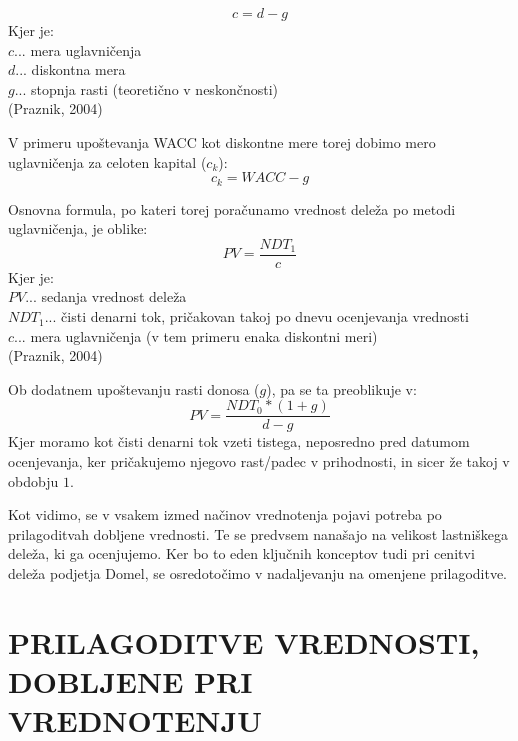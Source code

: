 \documentclass[12pt,a4paper]{amsart}
\theoremstyle{definition} %
\theoremstyle{plain} %
\begin{document}
\begin{equation}
c=d-g
\end{equation}
Kjer je:\\
$c$... mera uglavničenja\\
$d$... diskontna mera\\
$g$... stopnja rasti (teoretično v neskončnosti)\\
(Praznik, 2004)\par

V primeru upoštevanja WACC kot diskontne mere torej dobimo mero uglavničenja za celoten kapital ($c_k$):
\begin{equation}
c_k=WACC-g
\end{equation}

Osnovna formula, po kateri torej poračunamo vrednost deleža po metodi uglavničenja, je oblike:
\begin{equation}
PV=\frac{NDT_1}{c}
\end{equation}
Kjer je:\\
$PV$... sedanja vrednost deleža\\
$NDT_1$... čisti denarni tok, pričakovan takoj po dnevu ocenjevanja vrednosti\\
$c$... mera uglavničenja (v tem primeru enaka diskontni meri)\\
(Praznik, 2004)\par

Ob dodatnem upoštevanju rasti donosa ($g$), pa se ta preoblikuje v:
\begin{equation}
PV=\frac{NDT_0*(1+g)}{d-g}
\end{equation}
Kjer moramo kot čisti denarni tok vzeti tistega, neposredno pred datumom ocenjevanja, ker pričakujemo njegovo rast/padec v prihodnosti, in sicer že takoj v obdobju $1$.\par

Kot vidimo, se v vsakem izmed načinov vrednotenja pojavi potreba po prilagoditvah dobljene vrednosti. Te se predvsem nanašajo na velikost lastniškega deleža, ki ga ocenjujemo. Ker bo to eden ključnih konceptov tudi pri cenitvi deleža podjetja Domel, se osredotočimo v nadaljevanju na omenjene prilagoditve.




\section{\textbf{PRILAGODITVE VREDNOSTI, DOBLJENE PRI VREDNOTENJU}}
\end{document}
